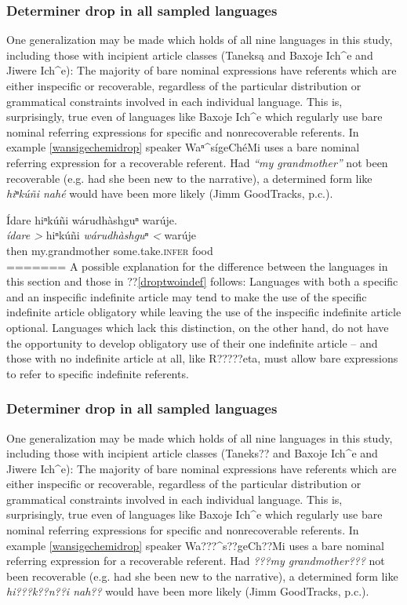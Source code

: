 \documentclass[output=paper]{LSP/langsci}
\begin{document}
\subsubsection{Determiner drop in all sampled languages}\label{dropsummary}

One generalization may be made which holds of all nine languages in this study, including those with incipient article classes (Taneksą and Baxoje Ich\^{}e and Jiwere Ich\^{}e): The majority of bare nominal expressions have referents which are either inspecific or recoverable, regardless of the particular distribution or grammatical constraints involved in each individual language. This is, surprisingly, true even of languages like Baxoje Ich\^{}e which regularly use bare nominal referring expressions for specific and nonrecoverable referents. In example \ref{wansigechemidrop} speaker Waⁿ\^{}sígeChéMi uses a bare nominal referring expression for a recoverable referent. Had \emph{“my grandmother”} not been recoverable (e.g. had she been new to the narrative), a determined form like \emph{hiⁿkúñi nahé} would have been more likely (Jimm GoodTracks, p.c.).

\ea\label{wansigechemidrop}
Ídare hiⁿkúñi wárudhàshguⁿ warúje.\footnotemark\\
\gll	\emph{ídare >} 		hiⁿkúñi 				\emph{wárudhàshguⁿ <}	warúje\\
	then 				my.grandmother 			some.take.\textsc{infer}	food\\
=======
A possible explanation for the difference between the languages in this section and those in ??\ref{droptwoindef} follows: Languages with both a specific and an inspecific indefinite article may tend to make the use of the specific indefinite article obligatory while leaving the use of the inspecific indefinite article optional. Languages which lack this distinction, on the other hand, do not have the opportunity to develop obligatory use of their one indefinite article -- and those with no indefinite article at all, like R?????eta, must allow bare expressions to refer to specific indefinite referents.

\subsubsection{Determiner drop in all sampled languages}\label{dropsummary}

One generalization may be made which holds of all nine languages in this study, including those with incipient article classes (Taneks?? and Baxoje Ich\^{}e and Jiwere Ich\^{}e): The majority of bare nominal expressions have referents which are either inspecific or recoverable, regardless of the particular distribution or grammatical constraints involved in each individual language. This is, surprisingly, true even of languages like Baxoje Ich\^{}e which regularly use bare nominal referring expressions for specific and nonrecoverable referents. In example \ref{wansigechemidrop} speaker Wa???\^{}s??geCh??Mi uses a bare nominal referring expression for a recoverable referent. Had \emph{???my grandmother???} not been recoverable (e.g. had she been new to the narrative), a determined form like \emph{hi???k??n??i nah??} would have been more likely (Jimm GoodTracks, p.c.).
\end{document}
